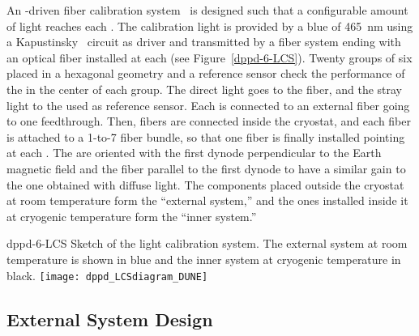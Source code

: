 An -driven fiber calibration system~\cite{Cuesta:2017nrs,Conrad:2015xta,Caccianiga:2003fm,ADAMSON2002325,Belver:2019lqm} is designed such that a configurable amount of light reaches each . The calibration light is provided by a blue  of \SI{465}{\nm} using a Kapustinsky~\cite{KAPUSTINSKY1985612} circuit as  driver and transmitted by a fiber system ending with an optical fiber installed at each  (see Figure~\ref{dppd-6-LCS}). Twenty groups of six  placed in a hexagonal geometry and a reference sensor check the performance of the  in the center of each group. The direct light goes to the fiber, and the stray light to the  used as reference sensor. Each  is connected to an external fiber going to one feedthrough. Then, fibers are connected inside the cryostat, and each fiber is attached to a 1-to-7 fiber bundle, so that one fiber is finally installed pointing at each . The  are oriented with the first dynode perpendicular to the Earth magnetic field and the fiber parallel to the first dynode to have a similar gain to the one obtained with diffuse light. The components placed outside the cryostat at room temperature form the ``external system,'' and the ones installed inside it at cryogenic temperature form the ``inner system.'' 

\begin{dunefigure}{dppd-6-LCS}
{Sketch of the    light calibration system. The external system at room temperature is shown in blue and the inner system at cryogenic temperature in black.}
\texttt{[image: dppd\_LCSdiagram\_DUNE]}
\end{dunefigure}

\subsection{External System Design}


